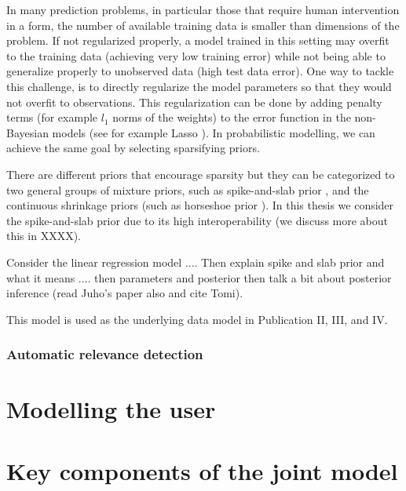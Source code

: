 \documentclass[dissertation,math,vertlayout,pdfa,colorlinks]{aaltoseries}
\begin{document}
In many prediction problems, in particular those that require human intervention in a form, the number of available training data is smaller than dimensions of the problem. If not regularized properly, a model trained in this setting may overfit to the training data (achieving very low training error) while not being able to generalize properly to unobserved data (high test data error). One way to tackle this challenge, is to directly regularize the model parameters so that they would not overfit to observations. This regularization can be done by adding penalty terms (for example $l_1$ norms of the weights) to the error function in the non-Bayesian models (see for example Lasso \cite{lasso2011}). In probabilistic modelling, we can achieve the same goal by selecting sparsifying priors. 

There are different priors that encourage sparsity but they can be categorized to two general groups of mixture priors, such as spike-and-slab prior \cite{spike_slab1993}, and the continuous shrinkage priors (such as horseshoe prior \cite{horseshoe_2017}). In this thesis we consider the spike-and-slab prior due to its high interoperability (we discuss more about this in XXXX).

Consider the linear regression model .... Then explain spike and slab prior and what it means .... then parameters and posterior then talk a bit about posterior inference (read Juho's paper also and cite Tomi).


This model is used as the underlying data model in Publication II, III, and IV. 




\subsubsection{Automatic relevance detection}


	





\section{Modelling the user}\label{prob_model_user}





\section{Key components of the joint model}\label{key_comp}
\end{document}
